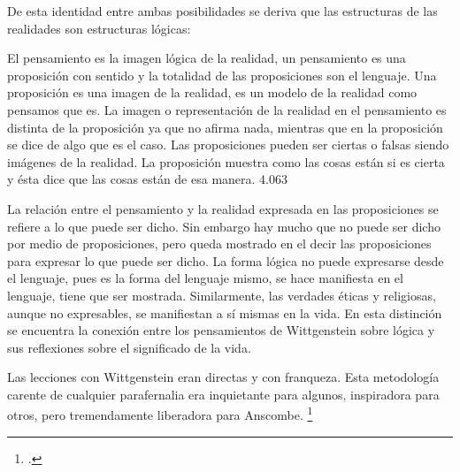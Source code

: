 De esta identidad entre ambas posibilidades se deriva que las estructuras de las
realidades son estructuras lógicas:

El pensamiento
es la imagen lógica de la realidad, un pensamiento es una proposición con
sentido y la totalidad de las proposiciones son el lenguaje. Una proposición es
una imagen de la realidad, es un modelo de la realidad como pensamos que es. La
imagen o representación de la realidad en el pensamiento es distinta de la
proposición ya que no afirma nada, mientras que en la proposición se dice de
algo que es el caso. Las proposiciones pueden ser ciertas o falsas siendo
imágenes de la realidad. La proposición muestra como las cosas están si es cierta
y ésta dice que las cosas están de esa manera.
4.063

La relación entre el pensamiento
y la realidad expresada en las proposiciones se refiere a lo que puede ser
dicho. Sin embargo hay mucho que no puede ser dicho por medio de proposiciones,
pero queda mostrado en el decir las proposiciones para expresar lo que puede ser
dicho. La forma lógica no puede expresarse desde el lenguaje, pues es la forma
del lenguaje mismo, se hace manifiesta en el lenguaje, tiene que ser mostrada.
Similarmente, las verdades éticas y religiosas, aunque no expresables, se
manifiestan a sí mismas en la vida. En esta distinción se encuentra la conexión
entre los pensamientos de Wittgenstein sobre lógica y sus reflexiones sobre el
significado de la vida.

Las lecciones con Wittgenstein eran directas y con franqueza. Esta metodología
carente de cualquier parafernalia era inquietante para algunos, inspiradora para
otros, pero tremendamente liberadora para Anscombe. \footcite[loc 9853 Chapter
4, Section 24, para. 5]{monk}

